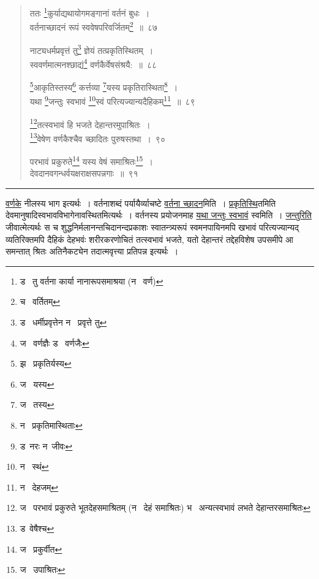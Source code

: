 \documentclass[11pt, openany]{book}
\begin{document}
\newpage

\begin{quote}
{\na ततः \renewcommand{\thefootnote}{1}\footnote{ड \textendash\ तु वर्तना कार्या नानारूपसमाश्रया (न \textendash\ वर्ण)}कुर्याद्यथायोगमङ्गानां वर्तनं बुधः~।\\
वर्तनाच्छादनं रूपं स्ववेषपरिवर्जितम्\renewcommand{\thefootnote}{2}\footnote{च \textendash\ वर्तितम्}~॥~८७

नाट्यधर्मप्रवृत्तं तु\renewcommand{\thefootnote}{3}\footnote{ड \textendash\ धर्मीप्रवृत्तेन न \textendash\ प्रवृत्ते तु} ज्ञेयं तत्प्रकृतिस्थितम्~।\\
स्ववर्णमात्मनश्छाद्यं\renewcommand{\thefootnote}{4}\footnote{ज \textendash\ वर्णज्ञैः ड \textendash\ वर्णजैः} वर्णकैर्वेषसंश्रयै:~॥~८८

\renewcommand{\thefootnote}{5}\footnote{झ \textendash\ प्रकृतिर्यस्य}आकृतिस्तस्य\renewcommand{\thefootnote}{6}\footnote{ज \textendash\ यस्य} कर्त्तव्या \renewcommand{\thefootnote}{7}\footnote{ज \textendash\ तस्य}यस्य प्रकृतिरास्थिता\renewcommand{\thefootnote}{8}\footnote{न \textendash\ प्रकृतिमास्थिताः}~।\\
यथा \renewcommand{\thefootnote}{9}\footnote{ड\textendash\ नरः न\textendash\ जीवः}जन्तुः स्वभावं \renewcommand{\thefootnote}{10}\footnote{न \textendash\ स्थं}स्वं परित्यज्यान्यदैहिकम्\renewcommand{\thefootnote}{11}\footnote{न \textendash\ देहजम्}~॥~८९

\renewcommand{\thefootnote}{12}\footnote{ज \textendash\ परभावं प्रकुरुते भूतदेहसमाश्रितम् (न \textendash\ देहं समाश्रितः) भ \textendash\ अन्यत्स्वभावं लभते देहान्तरसमाश्रितः}तत्स्वभावं हि भजते देहान्तरमुपाश्रितः~।\\
\renewcommand{\thefootnote}{13}\footnote{ड\textendash\ वेषैश्च}वेषेण वर्णकैश्चैव च्छादितः पुरुषस्तथा~।~९०

परभावं प्रकुरुते\renewcommand{\thefootnote}{14}\footnote{ज \textendash\ प्रकुर्वीत} यस्य वेषं समाश्रितः\renewcommand{\thefootnote}{15}\footnote{ज \textendash\ उपाश्रितः}~।\\
देवदानवगन्धर्वयक्षराक्षसपन्नगाः~॥~९१}
\end{quote}

\hrule

\vspace{2mm}
\noindent
\underline{वर्णके} नीलस्य भाग इत्यर्थः~। वर्तनाशब्दं पर्यायैर्व्याचष्टे \underline{वर्तना च्छादन}मिति~। \underline{प्रकृतिस्थि}तमिति देवमानुषादिस्वभावविभागेनावस्थितमित्यर्थः~। वर्तनस्य प्रयोजनमाह \underline{यथा जन्तुः स्वभावं} स्वमिति~। \underline{जन्तुरिति} जीवात्मेत्यर्थः स च शुद्धनिर्मलानन्तचिदानन्दप्रकाशः स्वातन्त्र्यरूपं स्वमनपायिनमपि खभावं परित्यज्यान्यद् व्यतिरिक्तमपि दैहिकं देहभवंः शरीरकरणोचितं तत्स्वभावं भजते, यतो देहान्तरं तद्देहविशेष उपसमीपे आ समन्तात् श्रितः अतिनैकट्येन तदात्मवृत्त्या प्रतिपन्न इत्यर्थः~।
\end{document}
